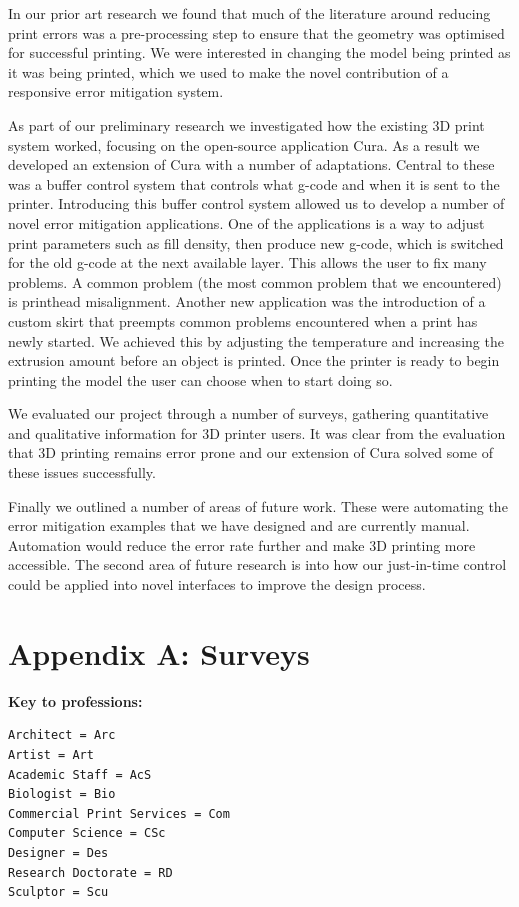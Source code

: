 \documentclass[pdftex, 11pt]{report} %
\begin{document}
In our prior art research we found that much of the literature around reducing print errors was a pre-processing step to ensure that the geometry was optimised for successful printing. We were interested in changing the model being printed as it was being printed, which we used to make the novel contribution of a responsive error mitigation system. 

As part of our preliminary research we investigated how the existing 3D print system worked, focusing on the open-source application Cura. As a result we developed an extension of Cura with a number of adaptations. Central to these was a buffer control system that controls what g-code and when it is sent to the printer. Introducing this buffer control system allowed us to develop a number of novel error mitigation applications. One of the applications is a way to adjust print parameters such as fill density, then produce new g-code, which is switched for the old g-code at the next available layer. This allows the user to fix many problems. A common problem (the most common problem that we encountered) is printhead misalignment. Another new application was the introduction of a custom skirt that preempts common problems encountered when a print has newly started. We achieved this by adjusting the temperature and increasing the extrusion amount before an object is printed. Once the printer is ready to begin printing the model the user can choose when to start doing so. 

We evaluated our project through a number of surveys, gathering quantitative and qualitative information for 3D printer users. It was clear from the evaluation that 3D printing remains error prone and our extension of Cura solved some of these issues successfully.  

Finally we outlined a number of areas of future work. These were automating the error mitigation examples that we have designed and are currently manual. Automation would reduce the error rate further and make 3D printing more accessible. The second area of future research is into how our just-in-time control could be applied into novel interfaces to improve the design process.




\chapter{Appendix A: Surveys}
\label{section:AppendixA}


\textbf{Key to professions:}
\begin{verbatim}
Architect = Arc
Artist = Art
Academic Staff = AcS
Biologist = Bio
Commercial Print Services = Com
Computer Science = CSc
Designer = Des
Research Doctorate = RD
Sculptor = Scu
\end{verbatim}
\end{document}
